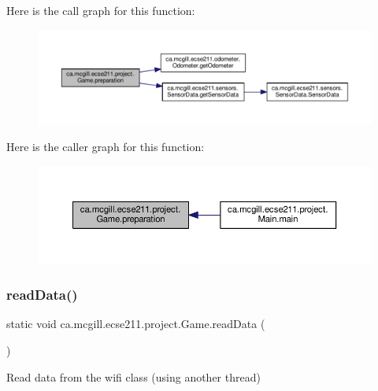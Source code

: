 Here is the call graph for this function\+:
\nopagebreak
\begin{figure}[H]
\begin{center}
\leavevmode
\includegraphics[width=350pt]{classca_1_1mcgill_1_1ecse211_1_1project_1_1_game_a1bcbd1c19309c65a6887ae19bde66765_cgraph}
\end{center}
\end{figure}
Here is the caller graph for this function\+:
\nopagebreak
\begin{figure}[H]
\begin{center}
\leavevmode
\includegraphics[width=350pt]{classca_1_1mcgill_1_1ecse211_1_1project_1_1_game_a1bcbd1c19309c65a6887ae19bde66765_icgraph}
\end{center}
\end{figure}
\mbox{\label{classca_1_1mcgill_1_1ecse211_1_1project_1_1_game_ac9f3ddab796dea6e753bfde7b87fa1b2}} 
\subsubsection{\texorpdfstring{read\+Data()}{readData()}}
{\footnotesize\ttfamily static void ca.\+mcgill.\+ecse211.\+project.\+Game.\+read\+Data (\begin{DoxyParamCaption}{ }\end{DoxyParamCaption})\hspace{0.3cm}{\ttfamily [static]}}

Read data from the wifi class (using another thread) 


